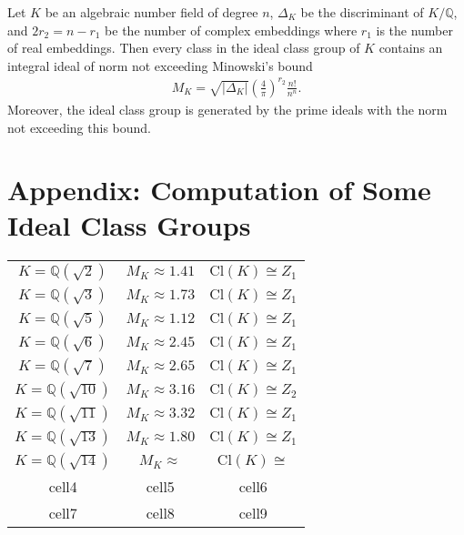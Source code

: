 \begin{thmbox}
    \begin{theorem}
        Let \(K\) be an algebraic number field of degree \(n\), \(\Delta_K\) be the discriminant of \(K / \mathbb{Q}\), and \(2 r_2 = n - r_1\) be the number of complex embeddings where \(r_1\) is the number of real embeddings. Then every class in the ideal class group of \(K\) contains an integral ideal of norm not exceeding Minowski's bound
        \begin{align*}
            M_K = \sqrt{|\Delta_K|} \left( \frac{4}{\pi} \right)^{r_2} \frac{n!}{n^n} \text{.}
        \end{align*}
        Moreover, the ideal class group is generated by the prime ideals with the norm not exceeding this bound.
    \end{theorem}
\end{thmbox}

\newpage
\section{Appendix: Computation of Some Ideal Class Groups}

\begin{center}
    \begin{tabular}{ c c c }
     \(K = \mathbb{Q}(\sqrt{2})\) & \(M_K \approx 1.41\) & \(\mathrm{Cl}(K) \cong Z_1 \) \\
     \(K = \mathbb{Q}(\sqrt{3})\) & \(M_K \approx 1.73\) & \(\mathrm{Cl}(K) \cong Z_1 \) \\
     \(K = \mathbb{Q}(\sqrt{5})\) & \(M_K \approx 1.12\) & \(\mathrm{Cl}(K) \cong Z_1 \) \\
     \(K = \mathbb{Q}(\sqrt{6})\) & \(M_K \approx 2.45\) & \(\mathrm{Cl}(K) \cong Z_1\) \\
     \(K = \mathbb{Q}(\sqrt{7})\) & \(M_K \approx 2.65\) & \(\mathrm{Cl}(K) \cong Z_1 \) \\
     \(K = \mathbb{Q}(\sqrt{10})\) & \(M_K \approx 3.16\) & \(\mathrm{Cl}(K) \cong Z_2 \) \\
     \(K = \mathbb{Q}(\sqrt{11})\) & \(M_K \approx 3.32\) & \(\mathrm{Cl}(K) \cong Z_1 \) \\
     \(K = \mathbb{Q}(\sqrt{13})\) & \(M_K \approx 1.80\) & \(\mathrm{Cl}(K) \cong Z_1 \) \\
     \(K = \mathbb{Q}(\sqrt{14})\) & \(M_K \approx\) & \(\mathrm{Cl}(K) \cong \) \\
     cell4 & cell5 & cell6 \\  
     cell7 & cell8 & cell9    
    \end{tabular}
\end{center}

